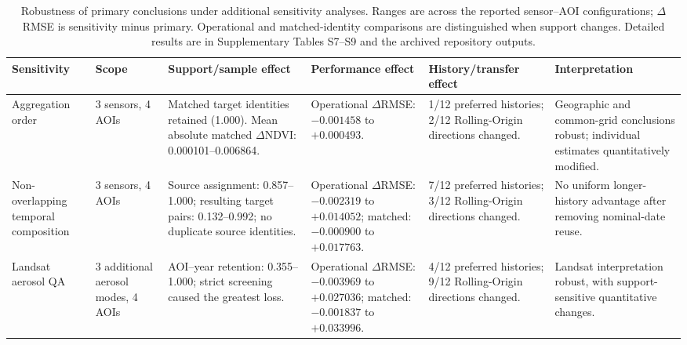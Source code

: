 \begin{table}[!t]\centering\footnotesize
\caption{Robustness of primary conclusions under additional sensitivity analyses. Ranges are across the reported sensor--AOI configurations; $\Delta$RMSE is sensitivity minus primary. Operational and matched-identity comparisons are distinguished when support changes. Detailed results are in Supplementary Tables S7--S9 and the archived repository outputs.}\label{tab:sensitivity}
\begin{tabularx}{\textwidth}{L{2.35cm}L{1.55cm}Y Y Y Y}\toprule
Sensitivity & Scope & Support/sample effect & Performance effect & History/transfer effect & Interpretation \\\midrule
Aggregation order & 3 sensors, 4 AOIs & Matched target identities retained (1.000). Mean absolute matched $\Delta$NDVI: 0.000101--0.006864. & Operational $\Delta$RMSE: $-0.001458$ to $+0.000493$. & 1/12 preferred histories; 2/12 Rolling-Origin directions changed. & Geographic and common-grid conclusions robust; individual estimates quantitatively modified. \\
Non-overlapping temporal composition & 3 sensors, 4 AOIs & Source assignment: 0.857--1.000; resulting target pairs: 0.132--0.992; no duplicate source identities. & Operational $\Delta$RMSE: $-0.002319$ to $+0.014052$; matched: $-0.000900$ to $+0.017763$. & 7/12 preferred histories; 3/12 Rolling-Origin directions changed. & No uniform longer-history advantage after removing nominal-date reuse. \\
Landsat aerosol QA & 3 additional aerosol modes, 4 AOIs & AOI--year retention: 0.355--1.000; strict screening caused the greatest loss. & Operational $\Delta$RMSE: $-0.003969$ to $+0.027036$; matched: $-0.001837$ to $+0.033996$. & 4/12 preferred histories; 9/12 Rolling-Origin directions changed. & Landsat interpretation robust, with support-sensitive quantitative changes. \\
\bottomrule\end{tabularx}
\end{table}
